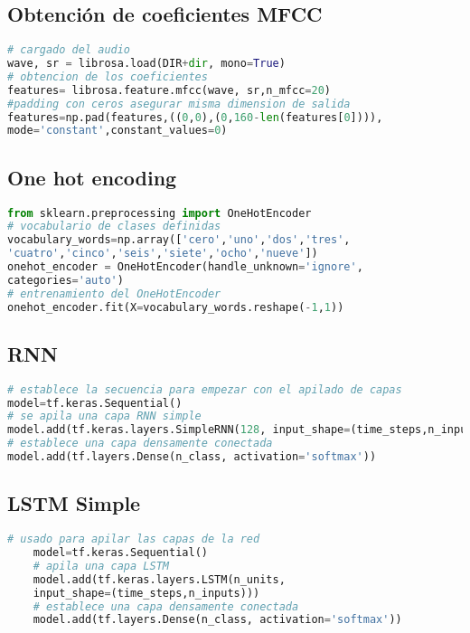 \subsection{Obtención de coeficientes MFCC}\label{MFCCC}
\begin{lstlisting}[language=Python,caption=Obtención de MFCC,captionpos=b]
# cargado del audio
wave, sr = librosa.load(DIR+dir, mono=True)
# obtencion de los coeficientes
features= librosa.feature.mfcc(wave, sr,n_mfcc=20)
#padding con ceros asegurar misma dimension de salida
features=np.pad(features,((0,0),(0,160-len(features[0]))),
mode='constant',constant_values=0)

\end{lstlisting}

\subsection{One hot encoding}\label{onehot}

\begin{lstlisting}[language=Python,caption=one hot encoding,captionpos=b,xleftmargin=.05\textwidth]
from sklearn.preprocessing import OneHotEncoder
# vocabulario de clases definidas
vocabulary_words=np.array(['cero','uno','dos','tres',
'cuatro','cinco','seis','siete','ocho','nueve'])
onehot_encoder = OneHotEncoder(handle_unknown='ignore',
categories='auto')
# entrenamiento del OneHotEncoder
onehot_encoder.fit(X=vocabulary_words.reshape(-1,1))
\end{lstlisting}

\subsection{RNN}\label{RNNCODE}

\begin{lstlisting}[language=Python,caption=Modelo LSTM,captionpos=b,xleftmargin=.05\textwidth]
# establece la secuencia para empezar con el apilado de capas
model=tf.keras.Sequential()
# se apila una capa RNN simple 
model.add(tf.keras.layers.SimpleRNN(128, input_shape=(time_steps,n_inputs)))
# establece una capa densamente conectada
model.add(tf.layers.Dense(n_class, activation='softmax'))

\end{lstlisting}
\subsection{LSTM Simple}\label{LSTMCODE}
\begin{center}
	\begin{lstlisting}[language=Python,caption=Modelo LSTM,captionpos=b,xleftmargin=.05\textwidth]
	# usado para apilar las capas de la red
	model=tf.keras.Sequential()
	# apila una capa LSTM
	model.add(tf.keras.layers.LSTM(n_units,
	input_shape=(time_steps,n_inputs)))
	# establece una capa densamente conectada
	model.add(tf.layers.Dense(n_class, activation='softmax'))
	
	
	\end{lstlisting}
\end{center}
